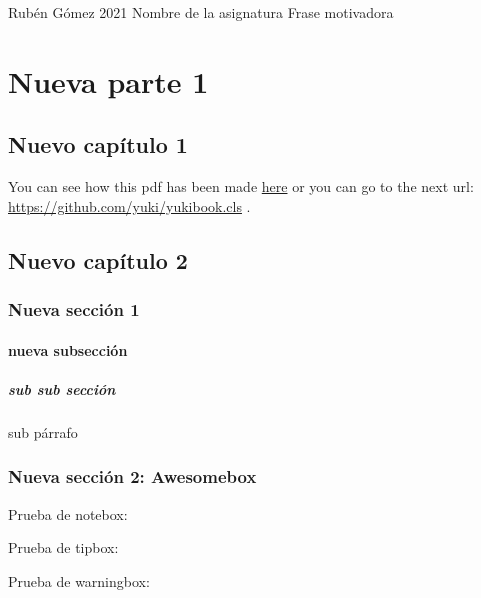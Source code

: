 \documentclass{yukibook}
\begin{document}
  {Rubén Gómez}			%
  {2021}				%
  {Nombre de la asignatura} %
  {Frase motivadora}	%


\part{Nueva parte 1}

\chapter{Nuevo capítulo 1}
You can see how this pdf has been made \href{https://github.com/yuki/yukibook.cls}{here} or you can go to the next url: \url{https://github.com/yuki/yukibook.cls} .


\Blindtext[2]

\chapter{Nuevo capítulo 2}
\Blindtext[2]

\section{Nueva sección 1}
\Blindtext[2]

\subsection{nueva subsección}
\Blindtext[1]

\subsubsection{sub sub sección}
\Blindtext[1]

\subparagraph{sub párrafo}
\Blindtext[1]

\section{Nueva sección 2: Awesomebox}
Prueba de notebox:
\notebox{\Blindtext[1]}

Prueba de tipbox:
\tipbox{\Blindtext[1]}

Prueba de warningbox:
\warningbox{\Blindtext[1]}
\end{document}
